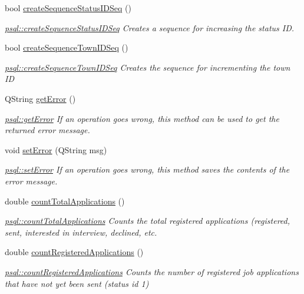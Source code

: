 \begin{DoxyCompactItemize}
bool \mbox{\hyperlink{classpsql_ae882aa80b2d629383fc2e60aecfd421a}{create\+Sequence\+Status\+I\+D\+Seq}} ()
\begin{DoxyCompactList}\small\item\em \mbox{\hyperlink{classpsql_ae882aa80b2d629383fc2e60aecfd421a}{psql\+::create\+Sequence\+Status\+I\+D\+Seq}} Creates a sequence for increasing the status ID. \end{DoxyCompactList}\item 
bool \mbox{\hyperlink{classpsql_a6ce21cb5a1e77cb0c280e2932d2b557d}{create\+Sequence\+Town\+I\+D\+Seq}} ()
\begin{DoxyCompactList}\small\item\em \mbox{\hyperlink{classpsql_a6ce21cb5a1e77cb0c280e2932d2b557d}{psql\+::create\+Sequence\+Town\+I\+D\+Seq}} Creates the sequence for incrementing the town ID \end{DoxyCompactList}\item 
Q\+String \mbox{\hyperlink{classpsql_a5f51e254b67ff932f287df2184ccc043}{get\+Error}} ()
\begin{DoxyCompactList}\small\item\em \mbox{\hyperlink{classpsql_a5f51e254b67ff932f287df2184ccc043}{psql\+::get\+Error}} If an operation goes wrong, this method can be used to get the returned error message. \end{DoxyCompactList}\item 
void \mbox{\hyperlink{classpsql_a9a0d5ba32aabe6018a36fb0bc185445b}{set\+Error}} (Q\+String msg)
\begin{DoxyCompactList}\small\item\em \mbox{\hyperlink{classpsql_a9a0d5ba32aabe6018a36fb0bc185445b}{psql\+::set\+Error}} If an operation goes wrong, this method saves the contents of the error message. \end{DoxyCompactList}\item 
double \mbox{\hyperlink{classpsql_a496d0a426a1539bf9babd1dd4e9fcd96}{count\+Total\+Applications}} ()
\begin{DoxyCompactList}\small\item\em \mbox{\hyperlink{classpsql_a496d0a426a1539bf9babd1dd4e9fcd96}{psql\+::count\+Total\+Applications}} Counts the total registered applications (registered, sent, interested in interview, declined, etc. \end{DoxyCompactList}\item 
double \mbox{\hyperlink{classpsql_a8673a80968d293cd3ead6e6e9da8dd8a}{count\+Registered\+Applications}} ()
\begin{DoxyCompactList}\small\item\em \mbox{\hyperlink{classpsql_a8673a80968d293cd3ead6e6e9da8dd8a}{psql\+::count\+Registered\+Applications}} Counts the number of registered job applications that have not yet been sent (status id 1) \end{DoxyCompactList}\item 

\end{DoxyCompactItemize}
